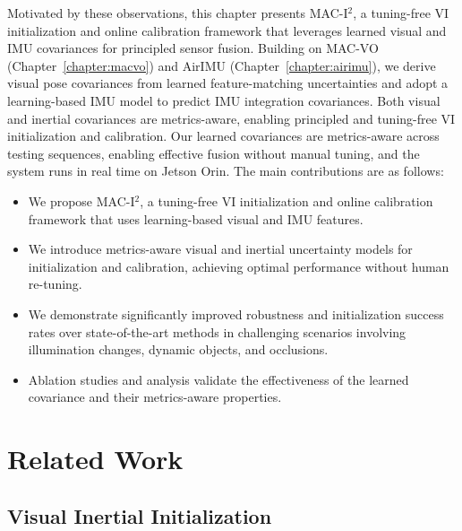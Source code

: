 Motivated by these observations, this chapter presents MAC-I$^2$, a tuning-free VI initialization and online calibration framework that leverages learned visual and IMU covariances for principled sensor fusion. 
Building on MAC-VO (Chapter~\ref{chapter:macvo}) and AirIMU (Chapter~\ref{chapter:airimu}), we derive visual pose covariances from learned feature-matching uncertainties and adopt a learning-based IMU model to predict IMU integration covariances. Both visual and inertial covariances are metrics-aware, enabling principled and tuning-free VI initialization and calibration.
Our learned covariances are metrics-aware across testing sequences, enabling effective fusion without manual tuning, and the system runs in real time on Jetson Orin.
The main contributions are as follows:
\begin{itemize}
    \item We propose MAC-I$^2$, a tuning-free VI initialization and online calibration framework that uses learning-based visual and IMU features.
    
    \item We introduce metrics-aware visual and inertial uncertainty models for initialization and calibration, achieving optimal performance without human re-tuning.
    
    \item We demonstrate significantly improved robustness and initialization success rates over state-of-the-art methods in challenging scenarios involving illumination changes, dynamic objects, and occlusions.
    
    \item Ablation studies and analysis validate the effectiveness of the learned covariance and their metrics-aware properties.
\end{itemize}


\section{Related Work}
\label{sec:maci2:related}

\subsection{Visual Inertial Initialization}

